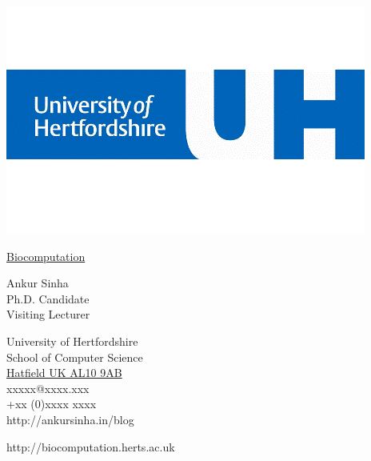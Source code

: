 \documentclass[9pt,a4paper]{memoir}
\begin{document}
\noindent
\begin{minipage}[c]{0.42\linewidth}
  \includegraphics[keepaspectratio,width=\textwidth]{UH-blue.png}
\end{minipage}
\begin{minipage}[c]{0.6\linewidth}
    \begin{raggedleft}
      \Huge{\selectfont \textcolor{uh-blue}{\underline{Biocomputation}}} \\
    \end{raggedleft}
\end{minipage}
\begin{Spacing}{1}
  \hspace*{-\parindent}%
  \begin{minipage}[c]{0.4\textwidth}
    \begin{raggedright}
    \LARGE{\textcolor{uh-blue}{Ankur Sinha}} \\
    \footnotesize{Ph.D. Candidate} \\
    \footnotesize{Visiting Lecturer} \\
    \end{raggedright}
  \end{minipage}
  \begin{minipage}[c]{0.6\textwidth}
    \begin{raggedleft}
      \small{University of Hertfordshire} \\
      \footnotesize{School of Computer Science} \\
      \footnotesize{\underline{Hatfield UK AL10 9AB}} \\
        \vspace{0.5mm}
      \footnotesize{xxxxx@xxxx.xxx} \\
      \footnotesize{+xx (0)xxxx xxxx} \\
      \footnotesize{http://ankursinha.in/blog} \\
    \end{raggedleft}
  \end{minipage}
\end{Spacing}
\begin{center}
  \footnotesize{http://biocomputation.herts.ac.uk}
\end{center}
\end{document}
